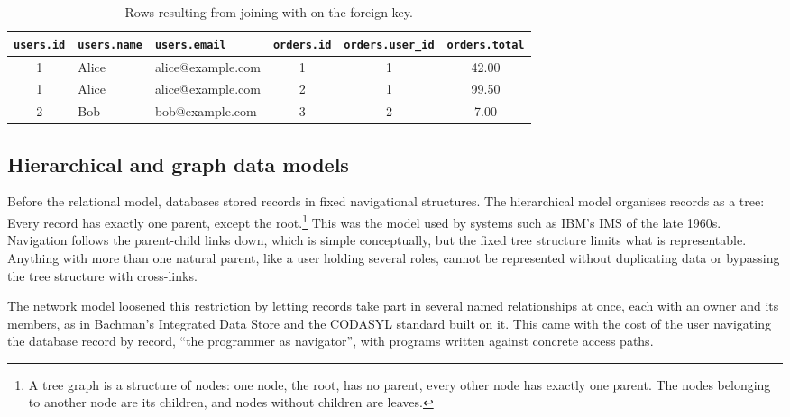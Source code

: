 \begin{table}[H]
	\centering
	\footnotesize
	\setlength{\tabcolsep}{4pt}
	\begin{tabular}{|c|l|l|c|c|c|}
		\hline
		\texttt{users.id}         & \texttt{users.name}         & \texttt{users.email}                    & \texttt{orders.id} & \texttt{orders.user\_id} & \texttt{orders.total} \\
		\hline
		\textcolor{pink700}{1}    & Alice                       & alice@example.com                       & 1                  & \textcolor{pink700}{1}   & 42.00                 \\
		\textcolor{pink700!40}{1} & \textcolor{black!40}{Alice} & \textcolor{black!40}{alice@example.com} & 2                  & \textcolor{pink700}{1}   & 99.50                 \\
		\textcolor{blue700}{2}    & Bob                         & bob@example.com                         & 3                  & \textcolor{blue700}{2}   & 7.00                  \\
		\hline
	\end{tabular}
	\caption{Rows resulting from joining  with  on the  foreign key.}
	\label{tab:join}
\end{table}



\subsection{Hierarchical and graph data models}
\label{sec:models}

Before the relational model, databases stored records in fixed navigational structures.
The hierarchical model organises records as a tree:
Every record has exactly one parent, except the root.\footnote{
	A tree graph is a structure of nodes:
	one node, the root, has no parent,
	every other node has exactly one parent.
	The nodes belonging to another node are its children,
	and nodes without children are leaves.
}
This was the model used by systems such as IBM's IMS of the late 1960s.
Navigation follows the parent-child links down,
which is simple conceptually, but the fixed tree structure limits what is representable.
Anything with more than one natural parent, like a user holding several roles,
cannot be represented without duplicating data
or bypassing the tree structure with cross-links.

The network model loosened this restriction by letting records take part in
several named relationships at once, each with an owner and its members,
as in Bachman's Integrated Data Store and the CODASYL standard built on it.
This came with the cost of the user navigating the database record by record,
``the programmer as navigator''\autocite{bachman1973},
with programs written against concrete access paths.

